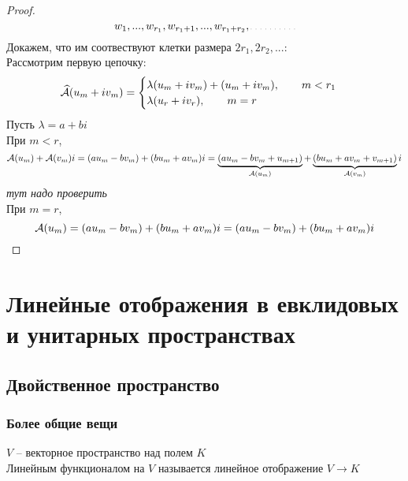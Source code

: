 \begin{proof}
	$$ w_1, ..., w_{r_1}, w_{r_1 + 1}, ..., w_{r_1 + r_2}, \widedots[4em] $$
	Докажем, что им соотвествуют клетки размера $ 2r_1, 2r_2, ... $: \\
	Рассмотрим первую цепочку:
	$$ \widehat{\mathcal{A}}(u_m + iv_m) =
	\begin{cases}
		\lambda(u_m + iv_m) + (u_m + iv_m), \qquad m < r_1 \\
		\lambda(u_r + iv_r), \qquad m = r
	\end{cases} $$
	Пусть $ \lambda = a + bi $ \\
	При $ m < r $,
	$$ \mathcal{A}(u_m) + \mathcal{A}(v_m)i = (au_m - bv_m) + (bu_m + av_m)i = \underbrace{(au_m - bv_m + u_{m + 1})}_{\mathcal{A}(u_m)} + \underbrace{(bu_m + av_m + v_{m + 1})}_{\mathcal{A}(v_m)}i $$
	\textit{тут надо проверить} \\
	При $ m = r $,
	$$ \mathcal{A}(u_m) = (au_m - bv_m) + (bu_m + av_m)i = (au_m - bv_m) + (bu_m + av_m)i $$
\end{proof}

\chapter{Линейные отображения в евклидовых и унитарных пространствах}

\section{Двойственное пространство}

\subsection{Более общие вещи}

\begin{definition}
	$ V $ -- векторное пространство над полем $ K $ \\
	Линейным функционалом на $ V $ называется линейное отображение $ V \to K $
\end{definition}

